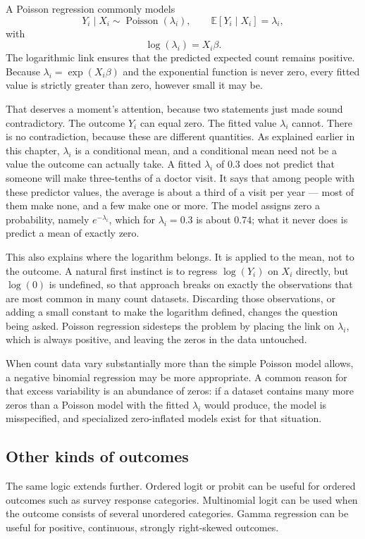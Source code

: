 \documentclass[11pt]{report}
\newcommand{\E}{\mathbb{E}}
\begin{document}
A Poisson regression commonly models
\[
Y_i\mid X_i \sim \operatorname{Poisson}(\lambda_i),
\qquad
\E[Y_i\mid X_i]=\lambda_i,
\]
with
\[
\log(\lambda_i)=X_i\beta.
\]
The logarithmic link ensures that the predicted expected count remains positive. Because \(\lambda_i=\exp(X_i\beta)\) and the exponential function is never zero, every fitted value is strictly greater than zero, however small it may be.

That deserves a moment's attention, because two statements just made sound contradictory. The outcome \(Y_i\) can equal zero. The fitted value \(\lambda_i\) cannot. There is no contradiction, because these are different quantities. As explained earlier in this chapter, \(\lambda_i\) is a conditional mean, and a conditional mean need not be a value the outcome can actually take. A fitted \(\lambda_i\) of \(0.3\) does not predict that someone will make three-tenths of a doctor visit. It says that among people with these predictor values, the average is about a third of a visit per year --- most of them make none, and a few make one or more. The model assigns zero a probability, namely \(e^{-\lambda_i}\), which for \(\lambda_i=0.3\) is about \(0.74\); what it never does is predict a mean of exactly zero.

This also explains where the logarithm belongs. It is applied to the mean, not to the outcome. A natural first instinct is to regress \(\log(Y_i)\) on \(X_i\) directly, but \(\log(0)\) is undefined, so that approach breaks on exactly the observations that are most common in many count datasets. Discarding those observations, or adding a small constant to make the logarithm defined, changes the question being asked. Poisson regression sidesteps the problem by placing the link on \(\lambda_i\), which is always positive, and leaving the zeros in the data untouched.

When count data vary substantially more than the simple Poisson model allows, a negative binomial regression may be more appropriate. A common reason for that excess variability is an abundance of zeros: if a dataset contains many more zeros than a Poisson model with the fitted \(\lambda_i\) would produce, the model is misspecified, and specialized zero-inflated models exist for that situation.

\subsection{Other kinds of outcomes}

The same logic extends further. Ordered logit or probit can be useful for ordered outcomes such as survey response categories. Multinomial logit can be used when the outcome consists of several unordered categories. Gamma regression can be useful for positive, continuous, strongly right-skewed outcomes.
\end{document}
